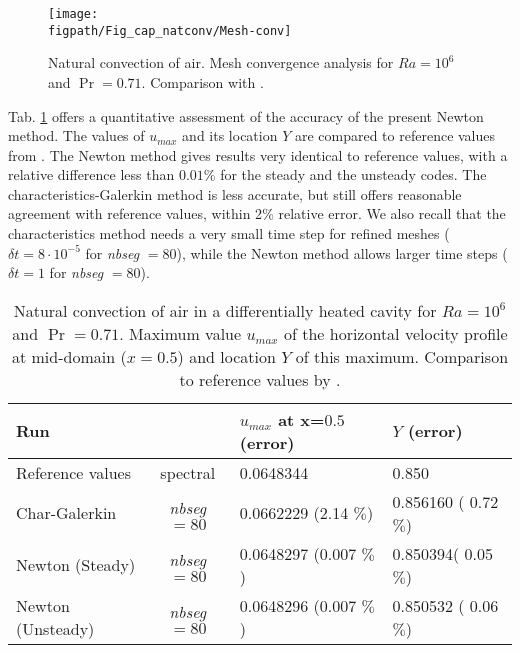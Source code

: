 \begin{figure}
	\begin{center}
		\texttt{[image: \\figpath/Fig\_cap\_natconv/Mesh-conv]} 
	\end{center}
	\caption{Natural convection of air. Mesh convergence analysis for $Ra=10^6$ and $\Pr = 0.71$. Comparison with \cite{LeQuere91}.}
	\label{fig-mesh-analysis}
\end{figure}


Tab. \ref{tab-valid-natconv} offers a quantitative assessment of the accuracy of the present Newton method. 
The values of $u_{max}$  and its location $Y$ are compared to reference values from \cite{LeQuere91}. 
The Newton method gives results very identical to reference values, with a relative difference less than $0.01 \%$ for the steady and the unsteady codes. 
The characteristics-Galerkin method is less accurate, but still offers reasonable agreement with reference values, within 2$\%$ relative error. 
We also recall that the characteristics method needs a very small time step for refined meshes ($\delta t = 8\cdot 10^{-5}$ for {\em nbseg} $= 80$), while the Newton method allows larger time steps ($\delta t = 1$ for {\em nbseg} $= 80$). %
\begin{table}%
	\begin{center}
		\begin{tabular}{|l|c|l|l|}
			\hline
			\multicolumn{2}{|l|}{Run} & $u_{max}$ at x=$0.5$ (error) & $Y$ (error) \\
			\hline
			Reference values & spectral & 0.0648344           & 0.850 \\ \hline
			Char-Galerkin       & {\em nbseg} $=80$ & 0.0662229 (2.14 $\%$) & 0.856160 ( 0.72 $\%$) \\ \hline
			Newton (Steady)        & {\em nbseg} $=80$ & 0.0648297 (0.007 $\%$) & 0.850394( 0.05 $\%$) \\ \hline
			Newton (Unsteady)        & {\em nbseg} $=80$ & 0.0648296 (0.007 $\%$) & 0.850532 ( 0.06 $\%$) \\ \hline
		\end{tabular}
	\end{center}
	\caption {Natural convection of air in a differentially heated cavity for $Ra = 10^6$ and $\Pr = 0.71$. Maximum value $u_{max}$ of the horizontal velocity profile at mid-domain ($x=0.5$) and location $Y$ of this maximum. Comparison to reference values by \cite{LeQuere91}.}
	\label{tab-valid-natconv}
\end{table}

